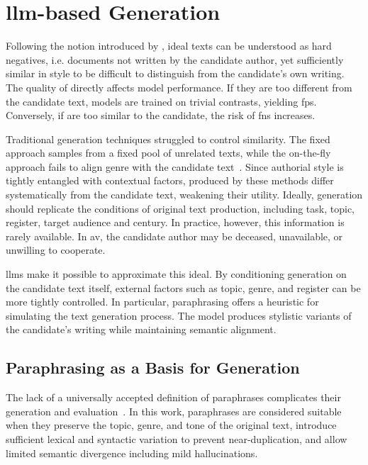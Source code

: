 \section{\acs{llm}-based \Imp{} Generation}
\label{sec:impostor_generation}

Following the notion introduced by \citet{koppel_determining_2014}, ideal \imp{} texts can be understood as hard negatives, i.e. documents not written by the candidate author, yet sufficiently similar in style to be difficult to distinguish from the candidate's own writing. 
The quality of \imps{} directly affects model performance.
If they are too different from the candidate text, models are trained on trivial contrasts, yielding \acp{fp}. 
Conversely, if \imps{} are too similar to the candidate, the risk of \acp{fn} increases.

Traditional \imp{} generation techniques struggled to control \imp{} similarity. 
The fixed approach samples from a fixed pool of unrelated texts, while the on-the-fly approach fails to align genre with the candidate text~\citep{koppel_determining_2014}. 
Since authorial style is tightly entangled with contextual factors, \imps{} produced by these methods differ systematically from the candidate text, weakening their utility. 
Ideally, \imp{} generation should replicate the conditions of original text production, including task, topic, register, target audience and century. 
In practice, however, this information is rarely available.
In \ac{av}, the candidate author may be deceased, unavailable, or unwilling to cooperate.

\acp{llm} make it possible to approximate this ideal. 
By conditioning generation on the candidate text itself, external factors such as topic, genre, and register can be more tightly controlled. 
In particular, paraphrasing offers a heuristic for simulating the text generation process. 
The model produces stylistic variants of the candidate's writing while maintaining semantic alignment.


\subsection{Paraphrasing as a Basis for \Imp{} Generation}

The lack of a universally accepted definition of paraphrases complicates their generation and evaluation~\citep{gohsen_task_oriented_2024}. 
In this work, paraphrases are considered suitable \imps{} when they preserve the topic, genre, and tone of the original text, introduce sufficient lexical and syntactic variation to prevent near-duplication, and allow limited semantic divergence including mild hallucinations.

